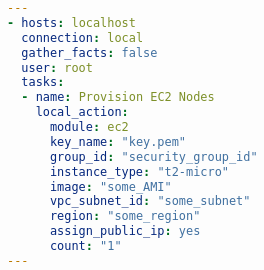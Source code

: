 \begin{lstlisting}[float,floatplacement=!ht,language=yaml,caption={Playbook To Create Instances On EC2},label={lst:provision},basicstyle=\small]
---
- hosts: localhost
  connection: local
  gather_facts: false
  user: root
  tasks:
  - name: Provision EC2 Nodes
    local_action:
      module: ec2
      key_name: "key.pem"
      group_id: "security_group_id"
      instance_type: "t2-micro"
      image: "some_AMI"
      vpc_subnet_id: "some_subnet"
      region: "some_region"
      assign_public_ip: yes
      count: "1"
---
\end{lstlisting}
